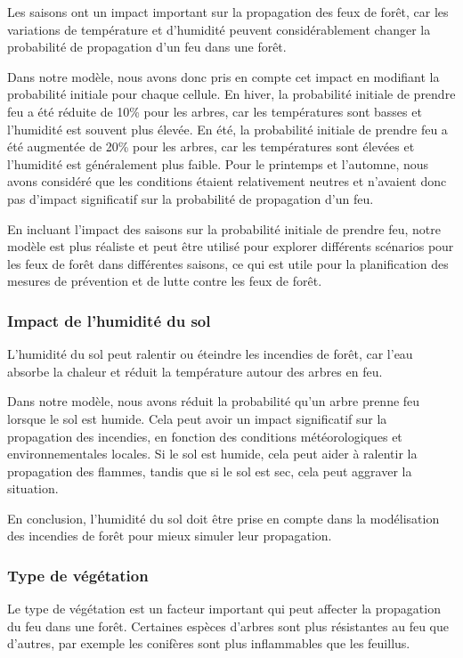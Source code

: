 Les saisons ont un impact important sur la propagation des feux de forêt, car les variations de température et d'humidité peuvent considérablement changer la probabilité de propagation d'un feu dans une forêt. 

Dans notre modèle, nous avons donc pris en compte cet impact en modifiant la probabilité initiale pour chaque cellule. En hiver, la probabilité initiale de prendre feu a été réduite de 10\% pour les arbres, car les températures sont basses et l'humidité est souvent plus élevée. En été, la probabilité initiale de prendre feu a été augmentée de 20\% pour les arbres, car les températures sont élevées et l'humidité est généralement plus faible. Pour le printemps et l'automne, nous avons considéré que les conditions étaient relativement neutres et n'avaient donc pas d'impact significatif sur la probabilité de propagation d'un feu. 

En incluant l'impact des saisons sur la probabilité initiale de prendre feu, notre modèle est plus réaliste et peut être utilisé pour explorer différents scénarios pour les feux de forêt dans différentes saisons, ce qui est utile pour la planification des mesures de prévention et de lutte contre les feux de forêt.

\subsubsection{Impact de l’humidité du sol}

L'humidité du sol peut ralentir ou éteindre les incendies de forêt, car l'eau absorbe la chaleur et réduit la température autour des arbres en feu.

Dans notre modèle, nous avons réduit la probabilité qu'un arbre prenne feu lorsque le sol est humide. Cela peut avoir un impact significatif sur la propagation des incendies, en fonction des conditions météorologiques et environnementales locales. Si le sol est humide, cela peut aider à ralentir la propagation des flammes, tandis que si le sol est sec, cela peut aggraver la situation. 

En conclusion, l'humidité du sol doit être prise en compte dans la modélisation des incendies de forêt pour mieux simuler leur propagation.

\subsubsection{Type de végétation}

Le type de végétation est un facteur important qui peut affecter la propagation du feu dans une forêt. Certaines espèces d'arbres sont plus résistantes au feu que d'autres, par exemple les conifères sont plus inflammables que les feuillus. 

